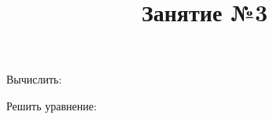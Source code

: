 \begin{listofex}
\begin{enumcols}[itemcolumns=2]
		\item {}
		\item {}
		\item {}
	\end{enumcols}
	\item Вычислить:
	\begin{enumcols}[itemcolumns=3]
		\item {}
		\item {}
		\item {}
	\end{enumcols}
	\item Решить уравнение:
	\begin{enumcols}[itemcolumns=2]
		\item {}
		\item {}
		\item {}
		\item {}
		\item {}
		\item {}
		\item {}
	\end{enumcols}
\end{listofex}
\newpage
\title{Занятие №3}

